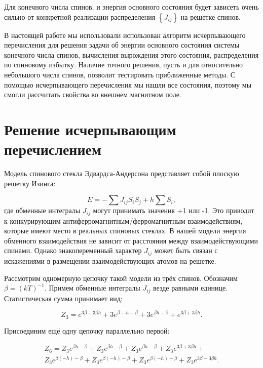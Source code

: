 \documentclass[utf8, babel, sor, jor, amsmath, amssymb, reprint]{elsarticle} %
\begin{document}
Для конечного числа спинов, и энергия основного состояния будет зависеть очень сильно от конкретной реализации распределения $\left\lbrace J_{ij} \right\rbrace $ на решетке спинов. 

В настоящей работе мы использовали использован алгоритм исчерпывающего перечисления \cite{padalko2021parallel} для решения задачи об энергии основного состояния системы конечного числа спинов, вычисления вырождения этого состояния, распределения по спиновому избытку. Наличие точного решения, пусть и для относительно небольшого числа спинов, позволит тестировать приближенные методы. С помощью исчерпывающего перечисления мы нашли все состояния, поэтому мы смогли рассчитать свойства во внешнем магнитном поле. 


\section{Решение исчерпывающим перечислением}

Модель спинового стекла Эдвардса-Андерсона представляет собой плоскую решетку Изинга:

\begin{equation}
	E = -\sum J_{ij} S_i S_j + h \sum S_i,
	\label{eq:ising_energy}
\end{equation}
где обменные интегралы $J_{ij}$ могут принимать значения +1 или -1. Это приводит к конкурирующим антиферромагнитным/ферромагнитным взаимодействиям, которые имеют место в реальных спиновых стеклах. В нашей модели энергия обменного взаимодействия не зависит от расстояния между взаимодействующими спинами. Однако знакопеременный характер $J_{ij}$ может быть связан с искажениями в размещении взаимодействующих атомов на решетке.

Рассмотрим одномерную цепочку такой модели из трёх спинов. Обозначим $\beta = (kT)^{-1}$. Примем обменные интегралы $J_{ij}$ везде равными единице. Статистическая сумма принимает вид:

\begin{equation}
	Z_3 = e^{3\beta - 3\beta h} + 3e^{\beta - h - \beta} + 3e^{\beta h - \beta} + e^{3\beta + 3\beta h}.
	\label{eq:stat_3}
\end{equation}

Присоединим ещё одну цепочку параллельно первой:

\begin{equation}
	\label{eq:stat_3_un}
	\begin{alignedat}{2}
		Z_6 = Z_3 e^{\beta  h-\beta }+Z_3 e^{\beta  h-\beta }+Z_3 e^{\beta  h-\beta }+Z_3 e^{3 \beta +3 \beta  h}+ \\
		Z_3 e^{\beta  (-h)-\beta }+Z_3 e^{\beta  (-h)-\beta }+Z_3 e^{\beta  (-h)-\beta }+Z_3 e^{3 \beta -3 \beta  h}.
	\end{alignedat}
\end{equation}
\end{document}
